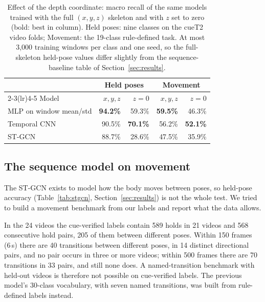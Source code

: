 \begin{table}[t]
\centering\footnotesize\setlength{\tabcolsep}{3pt}
\caption{Effect of the depth coordinate: macro recall of the same models trained with the full $(x,y,z)$ skeleton and with $z$ set to zero (bold: best in column). Held poses: nine classes on the cueT2 video folds; Movement: the 19-class rule-defined task. At most 3{,}000 training windows per class and one seed, so the full-skeleton held-pose values differ slightly from the sequence-baseline table of Section~\ref{sec:results}.}\label{tab:z-report}
\begin{tabular}{@{}lrrrr@{}}
\toprule
 & \multicolumn{2}{c}{Held poses} & \multicolumn{2}{c}{Movement} \\ \cmidrule(lr){2-3}\cmidrule(lr){4-5}
Model & $x,y,z$ & $z{=}0$ & $x,y,z$ & $z{=}0$ \\ \midrule
MLP on window mean/std & \textbf{94.2\%} & 59.3\% & \textbf{59.5\%} & 46.3\% \\
Temporal CNN & 90.5\% & \textbf{70.1\%} & 56.2\% & \textbf{52.1\%} \\
ST-GCN & 88.7\% & 28.6\% & 47.5\% & 35.9\% \\ \bottomrule
\end{tabular}
\end{table}


\subsection{The sequence model on movement}\label{sec:flow}
The ST-GCN exists to model how the body moves between poses, so held-pose accuracy (Table~\ref{tab:stgcn}, Section~\ref{sec:results}) is not the whole test. We tried to build a movement benchmark from our labels and report what the data allows.

 In the 24 videos the cue-verified labels contain 589 holds in 21 videos and 568 consecutive hold pairs, 205 of them between different poses. Within 150 frames (6\,s) there are 40 transitions between different poses, in 14 distinct directional pairs, and no pair occurs in three or more videos; within 500 frames there are 70 transitions in 33 pairs, and still none does. A named-transition benchmark with held-out videos is therefore not possible on cue-verified labels. The previous model's 30-class vocabulary, with seven named transitions, was built from rule-defined labels instead.

